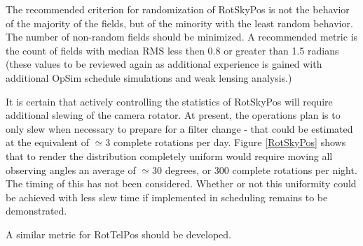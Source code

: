 The recommended criterion for randomization of RotSkyPos is not the behavior of the majority of the fields, but of the minority with the least random behavior.  The number of non-random fields should be minimized.  A recommended metric is the count of fields with median RMS less then 0.8 or greater than 1.5 radians (these values to be reviewed again as additional experience is gained with additional OpSim schedule simulations and weak lensing analysis.)

It is certain that actively controlling the statistics of RotSkyPos will require additional slewing of the camera rotator.  At present, the operations plan is to only slew when necessary to prepare for a filter change - that could be estimated at the equivalent of $\simeq 3$ complete rotations per day.  Figure \ref{RotSkyPos} shows that to render the distribution completely uniform would require moving all observing angles an average of $\simeq 30$ degrees, or 300 complete rotations per night.  The timing of this has not been considered.  Whether or not this uniformity could be achieved with less slew time if implemented in scheduling remains to be demonstrated.

A similar metric for RotTelPos should be developed. 
